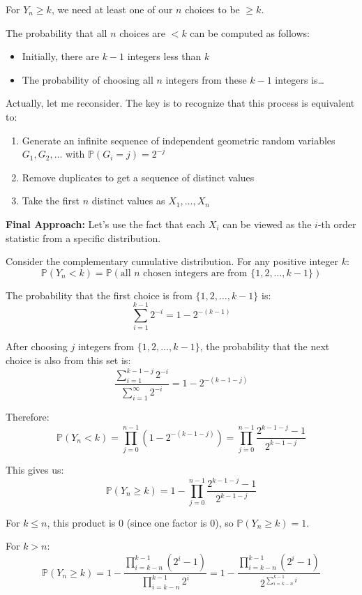 \documentclass[12pt,a4paper]{article}
\theoremstyle{definition}
\begin{document}
    For $Y_n \geq k$, we need at least one of our $n$ choices to be $\geq k$.

    The probability that all $n$ choices are $< k$ can be computed as follows:
    \begin{itemize}
        \item Initially, there are $k-1$ integers less than $k$
        \item The probability of choosing all $n$ integers from these $k-1$ integers is\ldots
    \end{itemize}

    Actually, let me reconsider. The key is to recognize that this process is equivalent to:
    \begin{enumerate}
        \item Generate an infinite sequence of independent geometric random variables $G_1, G_2, \ldots$ with $\mathbb{P}(G_i = j) = 2^{-j}$
        \item Remove duplicates to get a sequence of distinct values
        \item Take the first $n$ distinct values as $X_1, \ldots, X_n$
    \end{enumerate}

    \textbf{Final Approach:} Let's use the fact that each $X_i$ can be viewed as the $i$-th order statistic from a specific distribution.

    Consider the complementary cumulative distribution. For any positive integer $k$:
    $$\mathbb{P}(Y_n < k) = \mathbb{P}(\text{all } n \text{ chosen integers are from } \{1, 2, \ldots, k-1\})$$

    The probability that the first choice is from $\{1, 2, \ldots, k-1\}$ is:
    $$\sum_{i=1}^{k-1} 2^{-i} = 1 - 2^{-(k-1)}$$

    After choosing $j$ integers from $\{1, 2, \ldots, k-1\}$, the probability that the next choice is also from this set is:
    $$\frac{\sum_{i=1}^{k-1-j} 2^{-i}}{\sum_{i=1}^{\infty} 2^{-i}} = 1 - 2^{-(k-1-j)}$$

    Therefore:
    $$\mathbb{P}(Y_n < k) = \prod_{j=0}^{n-1} (1 - 2^{-(k-1-j)}) = \prod_{j=0}^{n-1} \frac{2^{k-1-j} - 1}{2^{k-1-j}}$$

    This gives us:
    $$\mathbb{P}(Y_n \geq k) = 1 - \prod_{j=0}^{n-1} \frac{2^{k-1-j} - 1}{2^{k-1-j}}$$

    For $k \leq n$, this product is 0 (since one factor is 0), so $\mathbb{P}(Y_n \geq k) = 1$.

    For $k > n$:
    $$\mathbb{P}(Y_n \geq k) = 1 - \frac{\prod_{i=k-n}^{k-1}(2^i - 1)}{\prod_{i=k-n}^{k-1} 2^i} = 1 - \frac{\prod_{i=k-n}^{k-1}(2^i - 1)}{2^{\sum_{i=k-n}^{k-1} i}}$$
\end{document}
